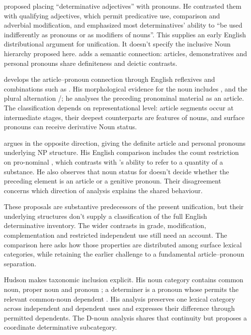 \documentclass[12pt]{article}
\begin{document}
\textcite[24]{palmer1924} proposed placing \enquote{determinative adjectives} with pronouns. He contrasted them with qualifying adjectives, which permit predicative use, comparison and adverbial modification, and emphasized most determinatives' ability to \enquote{be used indifferently as pronouns or as modifiers of nouns}. This supplies an early English distributional argument for unification. It doesn't specify the inclusive Noun hierarchy proposed here. \textcite[279]{lyons1968} adds a semantic connection: articles, demonstratives and personal pronouns share definiteness and deictic contrasts.

\textcite{postal1966} develops the article--pronoun connection through English reflexives and combinations such as . His morphological evidence for the noun  includes ,  and the plural alternation /; he analyses the preceding pronominal material as an article. The classification depends on representational level: article segments occur at intermediate stages, their deepest counterparts are features of nouns, and surface pronouns can receive derivative Noun status.

\textcite[197--203]{sommerstein1972} argues in the opposite direction, giving the definite article and personal pronouns underlying NP structure. His English comparison includes the count restriction on pro-nominal , which contrasts with 's ability to refer to a quantity of a substance. He also observes that noun status for  doesn't decide whether the preceding element is an article or a genitive pronoun. Their disagreement concerns which direction of analysis explains the shared behaviour.

These proposals are substantive predecessors of the present unification, but their underlying structures don't supply a classification of the full English determinative inventory. The wider contrasts in grade, modification, complementation and restricted independent use still need an account. The comparison here asks how those properties are distributed among surface lexical categories, while retaining the earlier challenge to a fundamental article--pronoun separation.

Hudson makes taxonomic inclusion explicit. His noun category contains common noun, proper noun and pronoun \citep[253--254]{hudson2010wordgrammar}; a determiner is a pronoun whose  permits the relevant common-noun dependent \citep[9--10]{hudson2004determiners}. His analysis preserves one lexical category across independent and dependent uses and expresses their difference through permitted dependents. The D-noun analysis shares that continuity but proposes a coordinate determinative subcategory.
\end{document}

